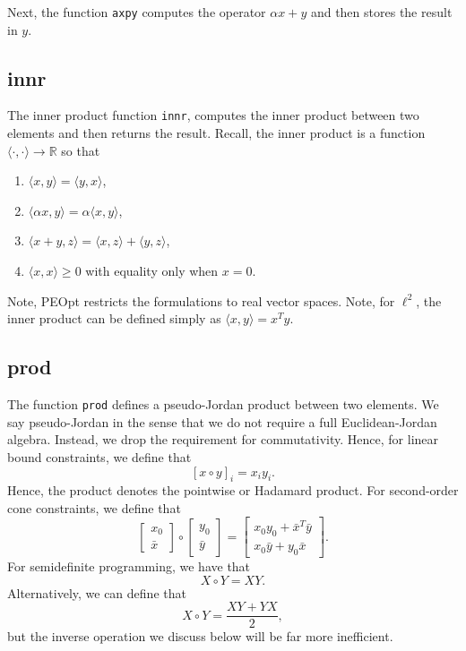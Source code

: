 \documentclass{report}
\newcommand{\re}{\mathbb{R}}
\begin{document}
        Next, the function \texttt{axpy} computes the operator $\alpha x + y$ and then stores the result in $y$.

\subsection{innr}

        The inner product function \texttt{innr}, computes the inner product between two elements and then returns the result.  Recall, the inner product is a function $\langle \cdot,\cdot \rangle\rightarrow \re$ so that
\begin{enumerate}
    \item $\langle x,y\rangle = \langle y,x \rangle$,
    \item $\langle \alpha x,y\rangle = \alpha \langle x,y\rangle$,
    \item $\langle x+y,z\rangle = \langle x,z\rangle + \langle y,z\rangle$,
    \item $\langle x,x\rangle\geq 0$ with equality only when $x=0$.
\end{enumerate}
Note, PEOpt restricts the formulations to real vector spaces.  Note, for $\ell^2$, the inner product can be defined simply as $\langle x,y\rangle=x^Ty$.

\subsection{prod}

        The function \texttt{prod} defines a pseudo-Jordan product between two elements.  We say pseudo-Jordan in the sense that we do not require a full Euclidean-Jordan algebra.  Instead, we drop the requirement for commutativity.  Hence, for linear bound constraints, we define that
$$
        [x\circ y]_i = x_iy_i.
$$
Hence, the product denotes the pointwise or Hadamard product.  For second-order cone constraints, we define that
$$
        \begin{bmatrix}x_0\\\bar{x}\end{bmatrix} \circ \begin{bmatrix}y_0\\\bar{y}\end{bmatrix}=\begin{bmatrix} x_0y_0 + \bar{x}^T\bar{y}\\x_0 \bar{y} + y_0 \bar{x}\end{bmatrix}.
$$
For semidefinite programming, we have that
$$
        X\circ Y = XY.
$$
Alternatively, we can define that
$$
        X\circ Y = \frac{XY + YX}{2},
$$
but the inverse operation we discuss below will be far more inefficient.
\end{document}
